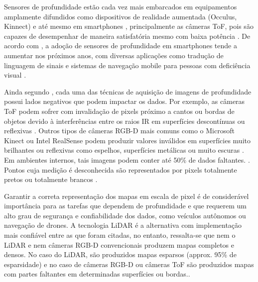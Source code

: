 Sensores de profundidade estão cada vez mais embarcados em equipamentos amplamente difundidos como dispositivos de realidade aumentada (Occulus, Kinnect) e até mesmo em smartphones \cite{du2020depthlab}, principalmente as câmeras ToF, pois são capazes de desempenhar de maneira satisfatória mesmo com baixa potência \cite{branscombe2018microsoft}. De acordo com \cite{xie2021ultradepth}, a adoção de sensores de profundidade em smartphones tende a aumentar nos próximos anos, com diversas aplicações como tradução de linguagem de sinais \cite{park2021enabling} e sistemas de navegação mobile para pessoas com deficiência visual \cite{see2022smartphone}.


Ainda segundo \cite{castellano2023performance}, cada uma das técnicas de aquisição de imagens de profundidade possui lados negativos que podem impactar os dados. Por exemplo, as câmeras ToF podem sofrer com invalidação de pixels próximo a cantos ou bordas de objetos devido à interferências entre os raios IR em superfícies descontínuas ou reflexivas \cite{hansard2012time}. Outros tipos de câmeras RGB-D mais comuns como o Microsoft Kinect ou Intel RealSense podem produzir valores inválidos em superfícies muito brilhantes ou reflexivas como espelhos, superfícies metálicas ou muito escuras \cite{zollhofer2019commodity}. Em ambientes internos, tais imagens podem conter até 50\% de dados faltantes. \cite{zhang2022indepth} \cite{zhang2018deep}. Pontos cuja medição é desconhecida são representados por pixels totalmente pretos ou totalmente brancos \cite{dourado2020multi}.



Garantir a correta representação dos mapas em escala de pixel é de considerável importância para as tarefas que dependem de profundidade e que requerem um alto grau de segurança e confiabilidade dos dados, como veículos autônomos ou navegação de drones. A tecnologia LiDAR é a alternativa com implementação mais confiável entre as que foram citadas, no entanto, ressalta-se que nem o LiDAR e nem câmeras RGB-D convencionais produzem mapas completos e densos. No caso do LiDAR, são produzidos mapas esparsos (approx. 95\% de esparsidade) e no caso de câmeras RGB-D ou câmeras ToF são produzidos mapas com partes faltantes em determinadas superfícies ou bordas.\cite{hu2012robust}. 




